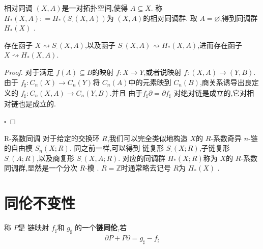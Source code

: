 \documentclass[../../几何与拓扑.tex]{subfiles}
\begin{document}
\begin{definition}{相对同调}
     \(  \left( X,A \right)   \)是一对拓扑空间,使得 \(  A\subseteq X  \). 称 \(  H_{*}\left( X,A \right): =  H_{*}\left( S_{\cdot }\left( X,A \right)  \right)    \)为 \(  \left( X,A \right)   \)的相对同调群.
     取 \(  A =  \varnothing  \),得到同调群 \(  H_{*}\left( X \right)   \)    .
\end{definition}

\begin{proposition}
    存在函子 \(  X \rightsquigarrow  S_{\cdot }\left( X,A \right)   \),以及函子 \(  S_{\cdot }\left( X,A \right) \rightsquigarrow  H_{*}\left( X,A \right)    \),进而存在函子 \(  X \rightsquigarrow  H_{*}\left( X,A \right)   \).   
 \end{proposition}
 \begin{proof}
    对于满足 \(  f\left( A \right)\subseteq B   \)的映射 \(  f:X\to Y  \),或者说映射 \(  f:\left( X,A \right)\to \left( Y,B \right)    \).由于 \(  f_{\sharp }:C_{n}\left( X \right)\to C_{n}\left( Y \right)    \)将 \(  C_{n}\left( A \right)   \)中的元素映到 \(  C_{n}\left( B \right)   \),商关系诱导出良定义的 \(  f_{\sharp }:C_{n}\left( X,A \right)\to C_{n}\left( Y,B \right)    \).并且 由于\(  f_{\sharp } \partial =  \partial f_{\sharp }  \)  对绝对链是成立的,它对相对链也是成立的.      

    \hfill $\square$
\end{proof}

\begin{definition}{R-系数同调}
    对于给定的交换环 \(  R  \),我们可以完全类似地构造 \(  X  \)的 \(  R  \)-系数奇异 \(  n  \)-链的自由模 \(  S_{n}\left( X;R \right)   \).
    同之前一样,可以得到 链复形 \(  S_{\cdot }\left( X;R \right)   \),子链复形 \(  S_{\cdot }\left( A;R \right)   \),以及商复形 \(  S_{\cdot }\left( X,A ;R\right)   \).
    对应的同调群 \(  H_{*}\left( X;R \right)   \)称为 \(  X  \)的 \(  R  \)-系数同调群,显然是一个分次 \(  R  \)-模 . \(  R= \mathbb{Z}   \)时通常略去记号 \(  R  \)为 \(  H_{*}\left( X \right)   \) .             
\end{definition}

\section{同伦不变性}
\begin{definition}
    称 \(  P  \)是 链映射 \(  f_{\sharp }  \)和  \(  g_{\sharp }  \) 的一个\textbf{链同伦},若 \[
     \partial P+ P \partial = g_{\sharp }-f_{\sharp }
    \]
\end{definition}
\end{document}
